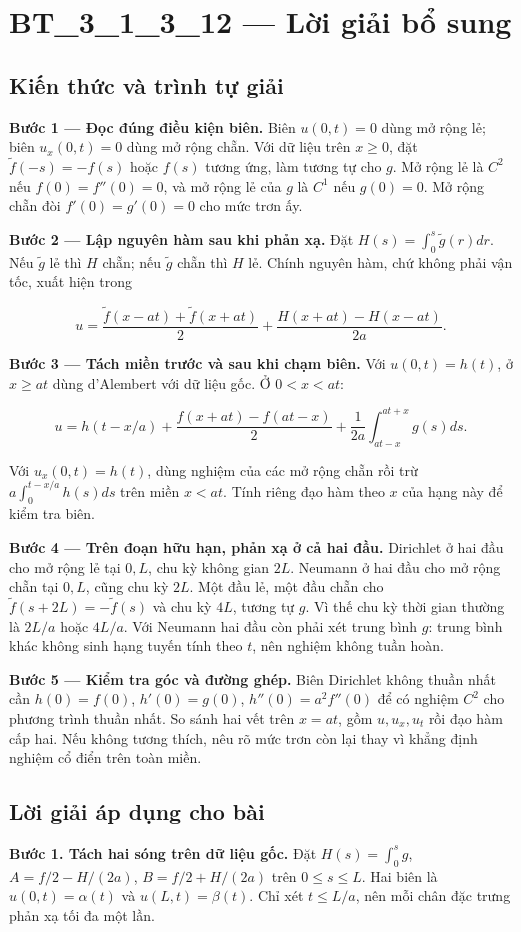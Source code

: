 \documentclass[10pt,a4paper]{article}
\begin{document}
\section*{BT\_3\_1\_3\_12 — Lời giải bổ sung}
\subsection*{Kiến thức và trình tự giải}
\textbf{Bước 1 — Đọc đúng điều kiện biên.} Biên $u(0,t)=0$ dùng mở rộng lẻ; biên $u_x(0,t)=0$ dùng mở rộng chẵn. Với dữ liệu trên $x\ge0$, đặt $\widetilde f(-s)=-f(s)$ hoặc $f(s)$ tương ứng, làm tương tự cho $g$. Mở rộng lẻ là $C^2$ nếu $f(0)=f''(0)=0$, và mở rộng lẻ của $g$ là $C^1$ nếu $g(0)=0$. Mở rộng chẵn đòi $f'(0)=g'(0)=0$ cho mức trơn ấy.

\textbf{Bước 2 — Lập nguyên hàm sau khi phản xạ.} Đặt $H(s)=\int_0^s\widetilde g(r)dr$. Nếu $\widetilde g$ lẻ thì $H$ chẵn; nếu $\widetilde g$ chẵn thì $H$ lẻ. Chính nguyên hàm, chứ không phải vận tốc, xuất hiện trong


\[
u=\frac{\widetilde f(x-at)+\widetilde f(x+at)}2+\frac{H(x+at)-H(x-at)}{2a}.
\]


\textbf{Bước 3 — Tách miền trước và sau khi chạm biên.} Với $u(0,t)=h(t)$, ở $x\ge at$ dùng d'Alembert với dữ liệu gốc. Ở $0<x<at$:


\[
u=h(t-x/a)+\frac{f(x+at)-f(at-x)}2+\frac1{2a}\int_{at-x}^{at+x}g(s)ds.
\]


Với $u_x(0,t)=h(t)$, dùng nghiệm của các mở rộng chẵn rồi trừ $a\int_0^{t-x/a}h(s)ds$ trên miền $x<at$. Tính riêng đạo hàm theo $x$ của hạng này để kiểm tra biên.

\textbf{Bước 4 — Trên đoạn hữu hạn, phản xạ ở cả hai đầu.} Dirichlet ở hai đầu cho mở rộng lẻ tại $0,L$, chu kỳ không gian $2L$. Neumann ở hai đầu cho mở rộng chẵn tại $0,L$, cũng chu kỳ $2L$. Một đầu lẻ, một đầu chẵn cho $\widetilde f(s+2L)=-\widetilde f(s)$ và chu kỳ $4L$, tương tự $g$. Vì thế chu kỳ thời gian thường là $2L/a$ hoặc $4L/a$. Với Neumann hai đầu còn phải xét trung bình $g$: trung bình khác không sinh hạng tuyến tính theo $t$, nên nghiệm không tuần hoàn.

\textbf{Bước 5 — Kiểm tra góc và đường ghép.} Biên Dirichlet không thuần nhất cần $h(0)=f(0)$, $h'(0)=g(0)$, $h''(0)=a^2f''(0)$ để có nghiệm $C^2$ cho phương trình thuần nhất. So sánh hai vết trên $x=at$, gồm $u,u_x,u_t$ rồi đạo hàm cấp hai. Nếu không tương thích, nêu rõ mức trơn còn lại thay vì khẳng định nghiệm cổ điển trên toàn miền.
\subsection*{Lời giải áp dụng cho bài}
\textbf{Bước 1. Tách hai sóng trên dữ liệu gốc.} Đặt $H(s)=\int_0^sg$, $A=f/2-H/(2a)$, $B=f/2+H/(2a)$ trên $0\le s\le L$. Hai biên là $u(0,t)=\alpha(t)$ và $u(L,t)=\beta(t)$. Chỉ xét $t\le L/a$, nên mỗi chân đặc trưng phản xạ tối đa một lần.
\end{document}
